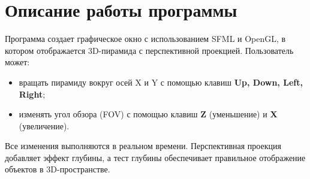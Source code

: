 \section*{Описание работы программы}
Программа создает графическое окно с использованием SFML и OpenGL, в котором отображается 3D-пирамида с перспективной проекцией. Пользователь может:
\begin{itemize}
    \item вращать пирамиду вокруг осей X и Y с помощью клавиш \textbf{Up, Down, Left, Right};
    \item изменять угол обзора (FOV) с помощью клавиш \textbf{Z} (уменьшение) и \textbf{X} (увеличение).
\end{itemize}

Все изменения выполняются в реальном времени. Перспективная проекция добавляет эффект глубины, а тест глубины обеспечивает правильное отображение объектов в 3D-пространстве.

